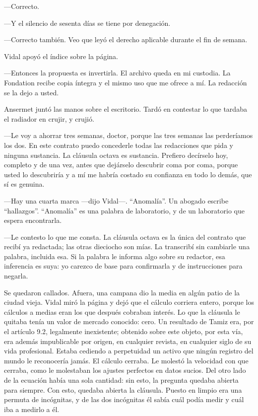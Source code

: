 ---Correcto.

---Y el silencio de sesenta días se tiene por denegación.

---Correcto también. Veo que leyó el derecho aplicable durante el fin de semana.

Vidal apoyó el índice sobre la página.

---Entonces la propuesta es invertirla. El archivo queda en mi custodia. La Fondation recibe copia íntegra y el mismo uso que me ofrece a mí. La redacción se la dejo a usted.

Ansermet juntó las manos sobre el escritorio. Tardó en contestar lo que tardaba el radiador en crujir, y crujió.

---Le voy a ahorrar tres semanas, doctor, porque las tres semanas las perderíamos los dos. En este contrato puedo concederle todas las redacciones que pida y ninguna sustancia. La cláusula octava es sustancia. Prefiero decírselo hoy, completo y de una vez, antes que dejárselo descubrir coma por coma, porque usted lo descubriría y a mí me habría costado su confianza en todo lo demás, que sí es genuina.

---Hay una cuarta marca ---dijo Vidal---. ``Anomalía''. Un abogado escribe ``hallazgos''. ``Anomalía'' es una palabra de laboratorio, y de un laboratorio que espera encontrarla.

---Le contesto lo que me consta. La cláusula octava es la única del contrato que recibí ya redactada; las otras dieciocho son mías. La transcribí sin cambiarle una palabra, incluida esa. Si la palabra le informa algo sobre su redactor, esa inferencia es suya: yo carezco de base para confirmarla y de instrucciones para negarla.

Se quedaron callados. Afuera, una campana dio la media en algún patio de la ciudad vieja. Vidal miró la página y dejó que el cálculo corriera entero, porque los cálculos a medias eran los que después cobraban interés. Lo que la cláusula le quitaba tenía un valor de mercado conocido: cero. Un resultado de Tamiz era, por el artículo 9.2, legalmente inexistente; obtenido sobre este objeto, por esta vía, era además impublicable por origen, en cualquier revista, en cualquier siglo de su vida profesional. Estaba cediendo a perpetuidad un activo que ningún registro del mundo le reconocería jamás. El cálculo cerraba. Le molestó la velocidad con que cerraba, como le molestaban los ajustes perfectos en datos sucios. Del otro lado de la ecuación había una sola cantidad: sin esto, la pregunta quedaba abierta para siempre. Con esto, quedaba abierta la cláusula. Puesto en limpio era una permuta de incógnitas, y de las dos incógnitas él sabía cuál podía medir y cuál iba a medirlo a él.

